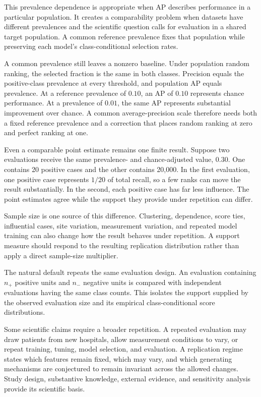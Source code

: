 \documentclass[11pt]{article}
\theoremstyle{remark}
\begin{document}
This prevalence dependence is appropriate when AP describes performance in a particular population. It creates a comparability problem when datasets have different prevalences and the scientific question calls for evaluation in a shared target population. A common reference prevalence fixes that population while preserving each model's class-conditional selection rates.

A common prevalence still leaves a nonzero baseline. Under population random ranking, the selected fraction is the same in both classes. Precision equals the positive-class prevalence at every threshold, and population AP equals prevalence. At a reference prevalence of $0.10$, an AP of $0.10$ represents chance performance. At a prevalence of $0.01$, the same AP represents substantial improvement over chance. A common average-precision scale therefore needs both a fixed reference prevalence and a correction that places random ranking at zero and perfect ranking at one.

Even a comparable point estimate remains one finite result. Suppose two evaluations receive the same prevalence- and chance-adjusted value, $0.30$. One contains 20 positive cases and the other contains 20,000. In the first evaluation, one positive case represents $1/20$ of total recall, so a few ranks can move the result substantially. In the second, each positive case has far less influence. The point estimates agree while the support they provide under repetition can differ.

Sample size is one source of this difference. Clustering, dependence, score ties, influential cases, site variation, measurement variation, and repeated model training can also change how the result behaves under repetition. A support measure should respond to the resulting replication distribution rather than apply a direct sample-size multiplier.

The natural default repeats the same evaluation design. An evaluation containing $n_+$ positive units and $n_-$ negative units is compared with independent evaluations having the same class counts. This isolates the support supplied by the observed evaluation size and its empirical class-conditional score distributions.

Some scientific claims require a broader repetition. A repeated evaluation may draw patients from new hospitals, allow measurement conditions to vary, or repeat training, tuning, model selection, and evaluation. A replication regime states which features remain fixed, which may vary, and which generating mechanisms are conjectured to remain invariant across the allowed changes. Study design, substantive knowledge, external evidence, and sensitivity analysis provide its scientific basis.
\end{document}
